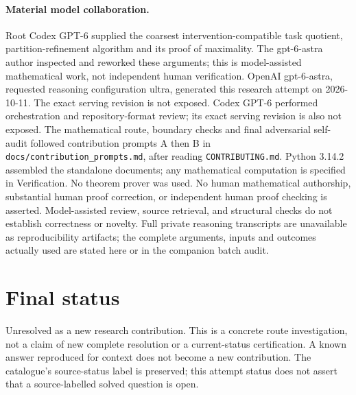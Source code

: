 \documentclass[11pt]{article}
\begin{document}
\paragraph{Material model collaboration.} Root Codex GPT-6 supplied the coarsest intervention-compatible task quotient, partition-refinement algorithm and its proof of maximality. The gpt-6-astra author inspected and reworked these arguments; this is model-assisted mathematical work, not independent human verification.
OpenAI gpt-6-astra, requested reasoning configuration ultra, generated this research
attempt on 2026-10-11. The exact serving revision is not exposed. Codex GPT-6
performed orchestration and repository-format review; its exact serving revision
is also not exposed. The mathematical route, boundary checks and final adversarial
self-audit followed contribution prompts A then B in
\texttt{docs/contribution\_prompts.md}, after reading \texttt{CONTRIBUTING.md}.
Python 3.14.2 assembled the standalone documents; any mathematical computation is
specified in Verification. No theorem prover was used. No human mathematical
authorship, substantial human proof correction, or independent human proof checking
is asserted. Model-assisted review, source retrieval, and structural checks do not
establish correctness or novelty. Full private reasoning transcripts are unavailable
as reproducibility artifacts; the complete arguments, inputs and outcomes actually
used are stated here or in the companion batch audit.
\section{Final status}
Unresolved as a new research contribution. This is a concrete route investigation,
not a claim of new complete resolution or a current-status certification. A known
answer reproduced for context does not become a new contribution. The catalogue's
source-status label is preserved; this attempt status does not assert that a
source-labelled solved question is open.
\end{document}
